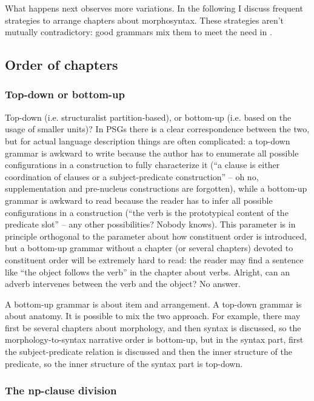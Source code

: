 \documentclass[UTF8, a4paper, oneside, scheme=plain]{ctexart}
\begin{document}
What happens next observes more variations.
In the following I discuss frequent strategies to arrange chapters about morphosyntax.
These strategies aren't mutually contradictory:
good grammars mix them to meet the need in .

\subsection{Order of chapters}

\subsubsection{Top-down or bottom-up}

Top-down (i.e. structuralist partition-based), 
or bottom-up (i.e. based on the usage of smaller units)? 
In PSGs there is a clear correspondence between the two, 
but for actual language description things are often complicated:
a top-down grammar is awkward to write 
because the author has to enumerate all possible configurations in a construction 
to fully characterize it
(``a clause is either coordination of clauses or a subject-predicate construction''
-- oh no, supplementation and pre-nucleus constructions are forgotten),
while a bottom-up grammar is awkward to read 
because the reader has to infer all possible configurations in a construction 
(``the verb is the prototypical content of the predicate slot''
-- any other possibilities? Nobody knows).
This parameter is in principle orthogonal to the parameter about how constituent order is introduced,
but a bottom-up grammar without a chapter (or several chapters) devoted to constituent order 
will be extremely hard to read:
the reader may find a sentence like ``the object follows the verb'' in the chapter about verbs.
Alright, can an adverb intervenes between the verb and the object? No answer.

A bottom-up grammar is about item and arrangement.
A top-down grammar is about anatomy.
It is possible to mix the two approach.
For example, there may first be several chapters about morphology,
and then syntax is discussed,
so the morphology-to-syntax narrative order is bottom-up,
but in the syntax part,
first the subject-predicate relation is discussed 
and then the inner structure of the predicate,
so the inner structure of the syntax part is top-down.

\subsubsection{The \ac{np}-clause division}\label{sec:np-clause-chapter}
\end{document}

